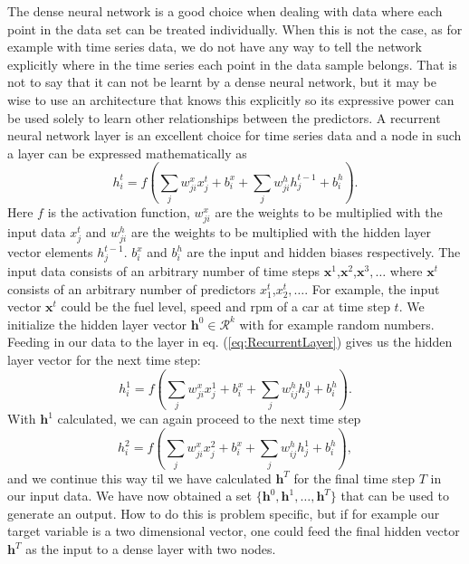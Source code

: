The dense neural network is a good choice when dealing with data where each point in the data set can be treated individually. When this is not the case, as for example with time series data, we do not have any way to tell the network explicitly where in the time series each point in the data sample belongs. That is not to say that it can not be learnt by a dense neural network, but it may be wise to use an architecture that knows this explicitly so its expressive power can be used solely to learn other relationships between the predictors. A recurrent neural network layer is an excellent choice for time series data and a node in such a layer can be expressed mathematically as \cite{RNN}
\begin{equation}
    \label{eq:RecurrentLayer}
    h^t_i = f(\sum_{j} w^x_{ji}x^t_j + b^x_i + \sum_j w^h_{ji}h^{t-1}_j + b^h_i).
\end{equation}
Here $f$ is the activation function, $w^x_{ji}$ are the weights to be multiplied with the input data $x_j^t$ and $w^h_{ji}$ are the weights to be multiplied with the hidden layer vector elements $h^{t-1}_j$. $b_i^x$ and $b_i^h$ are the input and hidden biases respectively. The input data consists of an arbitrary number of time steps $\boldsymbol{x}^1$,$\boldsymbol{x}^2$,$\boldsymbol{x}^3,\dots$ where $\boldsymbol{x}
^t$ consists of an arbitrary number of predictors $x
^t_1$,$x^t_2,\dots$. For example, the input vector $\boldsymbol{x}^t$ could be the fuel level, speed and rpm of a car at time step $t$. We initialize the hidden layer vector $\boldsymbol{h}^0 \in \mathcal{R}^k$ with for example random numbers. Feeding in our data to the layer in eq. (\ref{eq:RecurrentLayer}) gives us the hidden layer vector for the next time step:
$$h^1_i = f(\sum_j w^x_{ji}x_j^1 + b_i^x + \sum_j w^h_{ij}h^0_j + b_i^h).$$
With $\boldsymbol{h}^1$ calculated, we can again proceed to the next time step
$$h^2_i = f(\sum_j w^x_{ji}x_j^2 + b_i^x + \sum_j w^h_{ij}h^1_j + b_i^h),$$
and we continue this way til we have calculated $\boldsymbol{h}^T$ for the final time step $T$ in our input data.
We have now obtained a set $\{\boldsymbol{h}^0,\boldsymbol{h}^1,\dots,\boldsymbol{h}^T\}$ that can be used to generate an output. How to do this is problem specific, but if for example our target variable is a two dimensional vector, one could feed the final hidden vector $\boldsymbol{h}^T$ as the input to a dense layer with two nodes.
